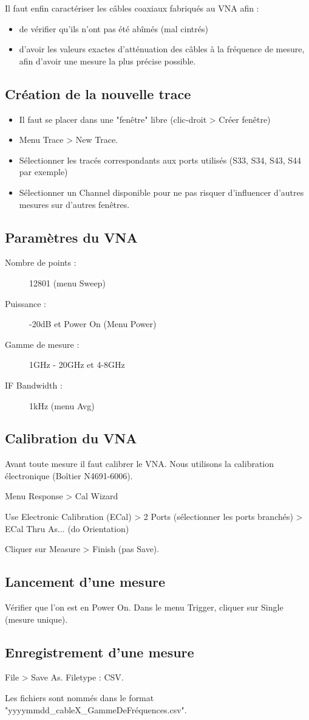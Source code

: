 Il faut enfin caractériser les câbles coaxiaux fabriqués au VNA afin :
\begin{itemize}
    \item de vérifier qu'ils n'ont pas été abîmés (mal cintrés)
    \item d'avoir les valeurs exactes d'atténuation des câbles à la fréquence de mesure, afin d'avoir une mesure la plus précise possible.
\end{itemize}

\subsection{Création de la nouvelle trace}
\begin{itemize}
    \item Il faut se placer dans une "fenêtre" libre (clic-droit > Créer fenêtre)
    \item Menu Trace > New Trace.
    \item Sélectionner les tracés correspondants aux ports utilisés (S33, S34, S43, S44 par exemple)
    \item Sélectionner un Channel disponible pour ne pas risquer d'influencer d'autres mesures sur d'autres fenêtres.
\end{itemize}

\subsection{Paramètres du VNA}
\begin{description}
    \item[Nombre de points :] 12801 (menu Sweep)
    \item[Puissance :] -20dB et Power On (Menu Power)
    \item[Gamme de mesure :] 1GHz - 20GHz et 4-8GHz
    \item[IF Bandwidth :] 1kHz (menu Avg)
\end{description}

\subsection{Calibration du VNA}
Avant toute mesure il faut calibrer le VNA. Nous utilisons la calibration électronique (Boîtier N4691-6006).

Menu Response > Cal Wizard

Use Electronic Calibration (ECal) > 2 Ports (sélectionner les ports branchés) > ECal Thru As... (do Orientation)

Cliquer sur Measure > Finish (pas Save).

\subsection{Lancement d'une mesure}
Vérifier que l'on est en Power On. Dans le menu Trigger, cliquer sur Single (mesure unique).

\subsection{Enregistrement d'une mesure}
File > Save As. Filetype : CSV.

Les fichiers sont nommés dans le format "yyyymmdd\_cableX\_GammeDeFréquences.csv".
